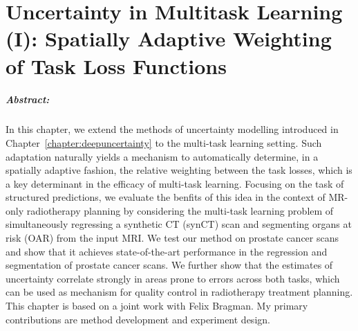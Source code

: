 
\chapter{Uncertainty in Multitask Learning (I): Spatially Adaptive Weighting of Task Loss Functions} \label{chapter:multitaskuncertainty_part1}

\paragraph{Abstract:} In this chapter, we extend the methods of uncertainty modelling introduced in Chapter~\ref{chapter:deepuncertainty} to the multi-task learning setting. Such adaptation naturally yields a mechanism to automatically determine, in a spatially adaptive fashion, the relative weighting between the task losses, which is a key determinant in the efficacy of multi-task learning. Focusing on the task of structured predictions, we evaluate the benfits of this idea in the context of MR-only radiotherapy planning by considering the multi-task learning problem of simultaneously regressing a synthetic CT (synCT) scan and segmenting  organs at risk (OAR) from the input MRI. We test our method on prostate cancer scans and show that it achieves state-of-the-art performance in the regression and segmentation of prostate cancer scans. We further show that the estimates of uncertainty correlate strongly in areas prone to errors across both tasks, which can be used as mechanism for quality control in radiotherapy treatment planning. This chapter is based on a joint work \cite{bragman2018uncertainty} with Felix Bragman. My primary contributions are method development and experiment design. 

